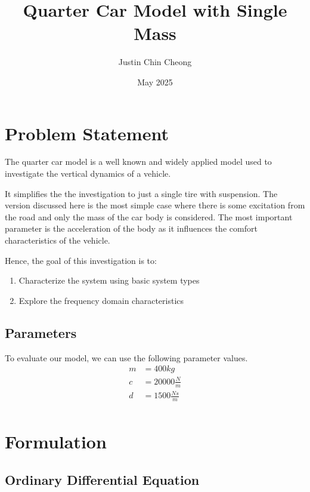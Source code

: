 \documentclass{article}
\title{Quarter Car Model with Single Mass}
\author{Justin Chin Cheong}
\date{May 2025}
\begin{document}
\maketitle

\section{Problem Statement}
The quarter car model is a well known and widely applied model used to investigate the vertical dynamics of a vehicle. 

\vspace{1em}

It simplifies the the investigation to just a single tire with suspension. The version discussed here is the most simple case where there is some excitation from the road and only the mass of the car body is considered. The most important parameter is the acceleration of the body as it influences the comfort characteristics of the vehicle.

\vspace{1em}

Hence, the goal of this investigation is to:
\begin{enumerate}
    \item Characterize the system using basic system types
    \item Explore the frequency domain characteristics
\end{enumerate}

\subsection{Parameters}
To evaluate our model, we can use the following parameter values. 
\begin{align*}
    m &= 400kg\\
    c &= 20 000 \frac{N}{m} \\
    d &= 1500 \frac{Ns}{m} \\
\end{align*}

\section{Formulation}

\subsection{Ordinary Differential Equation}
\end{document}
